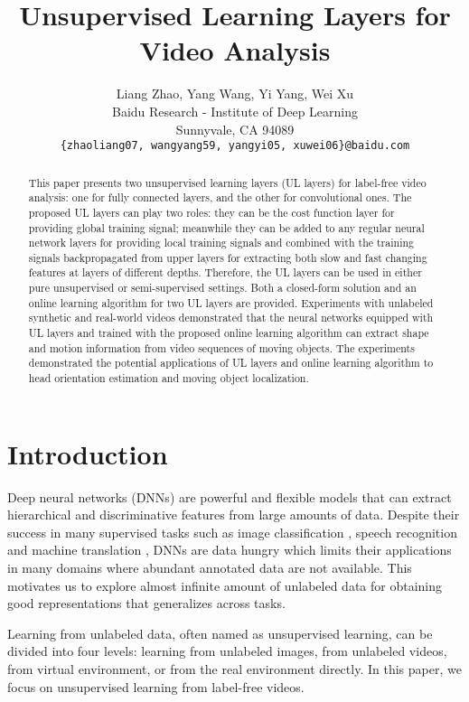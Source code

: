 \documentclass{article}
\title{Unsupervised Learning Layers for Video Analysis}
\author{
  Liang Zhao, Yang Wang, Yi Yang, Wei Xu\\
  Baidu Research - Institute of Deep Learning\\
  Sunnyvale, CA 94089\\
  \texttt{\{zhaoliang07, wangyang59, yangyi05, xuwei06\}@baidu.com}\\ 
}
\begin{document}
\maketitle

\begin{abstract}
This paper presents two unsupervised learning layers (UL layers) for label-free
 video analysis: one for fully connected layers, and the other for 
convolutional ones. The proposed UL layers can play two roles: they can be
 the cost function layer for providing global training signal; meanwhile they
 can be added to any regular neural network layers for providing local training
signals and combined with the training signals backpropagated from upper layers
for extracting both slow and fast changing features at layers of 
different depths. Therefore, the UL layers can be used in either pure unsupervised or semi-supervised settings.  
Both a closed-form solution and an online learning algorithm for 
two UL layers are provided.
Experiments with unlabeled synthetic and real-world videos 
demonstrated that the neural networks equipped with UL layers and trained with the 
proposed online learning algorithm can extract shape and motion information
from video sequences of moving objects.  The experiments demonstrated the potential 
applications of UL layers and online learning algorithm to head orientation estimation and moving object localization.
\end{abstract} 

\section{Introduction}
Deep neural networks (DNNs) are powerful and flexible models that can 
extract hierarchical and discriminative features from large amounts of data.
Despite their success in many supervised tasks such as image 
classification \cite{Krizhevsky12, He16}, speech recognition \cite{Yu12} and 
machine translation \cite{Wu16}, 
DNNs are data hungry which limits their applications in many domains where 
abundant annotated data are not available. This motivates us to explore 
almost infinite amount of unlabeled data for obtaining good representations 
that generalizes across tasks.

Learning from unlabeled data, often named as unsupervised learning, can be 
divided into four levels: learning from unlabeled images, from unlabeled 
videos, from virtual environment, or from the real environment directly. In 
this paper, we focus on unsupervised learning from label-free videos.
\end{document}
